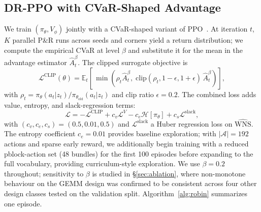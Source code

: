\documentclass[journal]{IEEEtran}
\begin{document}
\subsection{DR-PPO with CVaR-Shaped Advantage}
We train $(\pi_\theta, V_\phi)$ jointly with a CVaR-shaped variant of PPO~\cite{schulman2017ppo}. At iteration $t$, $K$ parallel P\&R runs across seeds and corners yield a return distribution; we compute the empirical CVaR at level $\beta$ and substitute it for the mean in the advantage estimator $\hat{A}^{\beta}_t$. The clipped surrogate objective is
\begin{equation}
\mathcal{L}^{\text{CLIP}}(\theta) = \mathbb{E}_t\!\left[\, \min\!\left(\rho_t \hat{A}^{\beta}_t,\; \mathrm{clip}(\rho_t, 1{-}\epsilon, 1{+}\epsilon)\, \hat{A}^{\beta}_t \right) \right],
\label{eq:ppoclip}
\end{equation}
with $\rho_t = \pi_\theta(a_t|z_t) / \pi_{\theta_{\text{old}}}(a_t|z_t)$ and clip ratio $\epsilon = 0.2$. The combined loss adds value, entropy, and slack-regression terms:
\begin{equation}
\mathcal{L} = -\mathcal{L}^{\text{CLIP}} + c_v \mathcal{L}^V - c_e \mathcal{H}[\pi_\theta] + c_s \mathcal{L}^{\text{slack}},
\label{eq:loss}
\end{equation}
with $(c_v, c_e, c_s) = (0.5, 0.01, 0.5)$ and $\mathcal{L}^{\text{slack}}$ a Huber regression loss on $\widehat{\mathrm{WNS}}$. The entropy coefficient $c_e = 0.01$ provides baseline exploration; with $|\mathcal{A}| = 192$ actions and sparse early reward, we additionally begin training with a reduced pblock-action set (48 bundles) for the first 100 episodes before expanding to the full vocabulary, providing curriculum-style exploration. We use $\beta = 0.2$ throughout; sensitivity to $\beta$ is studied in \S\ref{sec:ablation}, where non-monotone behaviour on the GEMM design was confirmed to be consistent across four other design classes tested on the validation split. Algorithm~\ref{alg:robin} summarizes one episode.
\end{document}
